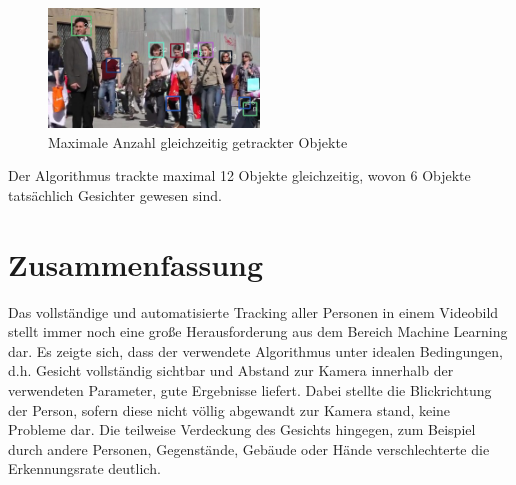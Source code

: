 \documentclass[a4paper, 11pt, twocolumn]{article}
\begin{document}
\begin{figure}[htpb]
	\begin{center}
		\includegraphics[width=0.5\textwidth]{maxAnzahlFussgaengerTotal.png}
	\end{center}
	\caption{Maximale Anzahl gleichzeitig getrackter Objekte}
	\label{fig:maxanzahl_total}
\end{figure}

Der Algorithmus trackte maximal 12 Objekte gleichzeitig, wovon 6 Objekte tatsächlich Gesichter gewesen sind.


\section{Zusammenfassung} %
\label{sec:zusammenfassung}

Das vollständige und automatisierte Tracking aller Personen in einem Videobild stellt immer noch eine große Herausforderung aus dem Bereich Machine Learning dar. Es zeigte sich, dass der verwendete Algorithmus unter idealen Bedingungen, d.h. Gesicht vollständig sichtbar und Abstand zur Kamera innerhalb der verwendeten Parameter, gute Ergebnisse liefert. Dabei stellte die Blickrichtung der Person, sofern diese nicht völlig abgewandt zur Kamera stand, keine Probleme dar. Die teilweise Verdeckung des Gesichts hingegen, zum Beispiel durch andere Personen, Gegenstände, Gebäude oder Hände verschlechterte die Erkennungsrate deutlich.




\end{document}
